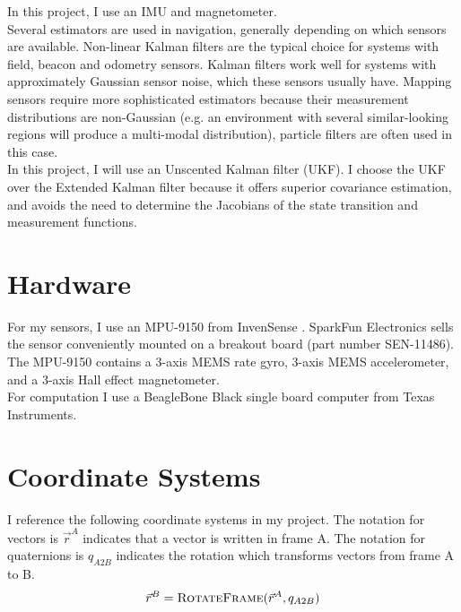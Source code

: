 \documentclass[conference]{IEEEtran}
\begin{document}
In this project, I use an IMU and magnetometer.\\

Several estimators are used in navigation, generally depending on which sensors are available. Non-linear Kalman filters are the typical choice for systems with field, beacon and odometry sensors. Kalman filters work well for systems with approximately Gaussian sensor noise, which these sensors usually have. Mapping sensors require more sophisticated estimators because their measurement distributions are non-Gaussian (e.g. an environment with several similar-looking regions will produce a multi-modal distribution), particle filters are often used in this case.\\

 In this project, I will use an Unscented Kalman filter (UKF). I choose the UKF over the Extended Kalman filter because it offers superior covariance estimation, and avoids the need to determine the Jacobians of the state transition and measurement functions.\\ 

\section{Hardware}
For my sensors, I use an MPU-9150 from InvenSense \cite{mpu9150}. SparkFun Electronics sells the sensor conveniently mounted on a breakout board (part number SEN-11486). The MPU-9150 contains a 3-axis MEMS rate gyro, 3-axis MEMS accelerometer, and a 3-axis Hall effect magnetometer.\\
For computation I use a BeagleBone Black single board computer from Texas Instruments.\\

\section{Coordinate Systems}
I reference the following coordinate systems in my project. The notation for vectors is $\vec{r}^{A}$ indicates that a vector is written in frame A. The notation for quaternions is $q_{A2B}$ indicates the rotation which transforms vectors from frame A to B.
\begin{equation}
  \vec{r}^{B} = \textproc{RotateFrame}(\vec{r}^{A}, q_{A2B})
\end{equation}
\end{document}
